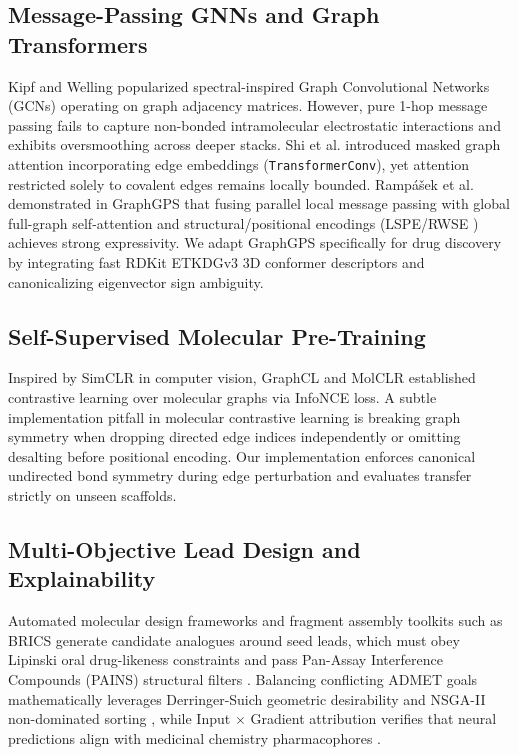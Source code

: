 \documentclass[conference]{IEEEtran}
\begin{document}
\subsection{Message-Passing GNNs and Graph Transformers}
Kipf and Welling \cite{Kipf2017GCN} popularized spectral-inspired Graph Convolutional Networks (GCNs) operating on graph adjacency matrices. However, pure 1-hop message passing fails to capture non-bonded intramolecular electrostatic interactions and exhibits oversmoothing across deeper stacks. Shi et al. \cite{Shi2021TransformerConv} introduced masked graph attention incorporating edge embeddings (\texttt{TransformerConv}), yet attention restricted solely to covalent edges remains locally bounded. Ramp{\'a}{\v{s}}ek et al. \cite{Rampasek2022GraphGPS} demonstrated in GraphGPS that fusing parallel local message passing with global full-graph self-attention and structural/positional encodings (LSPE/RWSE \cite{Dwivedi2022LSPE}) achieves strong expressivity. We adapt GraphGPS specifically for drug discovery by integrating fast RDKit ETKDGv3 3D conformer descriptors \cite{Riniker2015ETKDG} and canonicalizing eigenvector sign ambiguity.

\subsection{Self-Supervised Molecular Pre-Training}
Inspired by SimCLR \cite{Chen2020SimCLR} in computer vision, GraphCL \cite{You2020GraphCL} and MolCLR \cite{Wang2022MolCLR} established contrastive learning over molecular graphs via InfoNCE loss. A subtle implementation pitfall in molecular contrastive learning is breaking graph symmetry when dropping directed edge indices independently or omitting desalting before positional encoding. Our implementation enforces canonical undirected bond symmetry during edge perturbation and evaluates transfer strictly on unseen scaffolds.

\subsection{Multi-Objective Lead Design and Explainability}
Automated molecular design frameworks \cite{GomezBombarelli2018} and fragment assembly toolkits such as BRICS \cite{Degen2008BRICS} generate candidate analogues around seed leads, which must obey Lipinski oral drug-likeness constraints \cite{Lipinski2001Ro5} and pass Pan-Assay Interference Compounds (PAINS) structural filters \cite{Baell2010PAINS}. Balancing conflicting ADMET goals mathematically leverages Derringer-Suich geometric desirability \cite{Derringer1980Desirability} and NSGA-II non-dominated sorting \cite{Deb2002NSGA2}, while Input $\times$ Gradient attribution \cite{Shrikumar2017InputGrad} verifies that neural predictions align with medicinal chemistry pharmacophores \cite{Wang2016hERG}.
\end{document}

